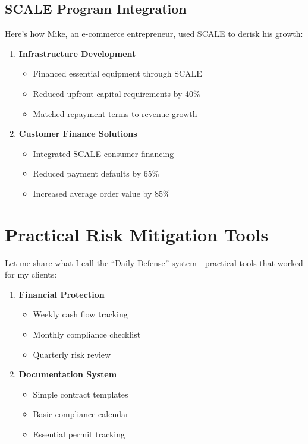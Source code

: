 \subsection{SCALE Program Integration}\label{subsec:scale-program-integration}

Here's how Mike, an e-commerce entrepreneur, used SCALE to derisk his growth:

\begin{enumerate}
    \item \textbf{Infrastructure Development}
    \begin{itemize}
        \item Financed essential equipment through SCALE
        \item Reduced upfront capital requirements by 40\%
        \item Matched repayment terms to revenue growth
    \end{itemize}

    \item \textbf{Customer Finance Solutions}
    \begin{itemize}
        \item Integrated SCALE consumer financing
        \item Reduced payment defaults by 65\%
        \item Increased average order value by 85\%
    \end{itemize}
\end{enumerate}

\section{Practical Risk Mitigation Tools}\label{sec:risk-tools}

Let me share what I call the ``Daily Defense'' system—practical tools that worked for my clients:

\begin{enumerate}
    \item \textbf{Financial Protection}
    \begin{itemize}
        \item Weekly cash flow tracking
        \item Monthly compliance checklist
        \item Quarterly risk review
    \end{itemize}

    \item \textbf{Documentation System}
    \begin{itemize}
        \item Simple contract templates
        \item Basic compliance calendar
        \item Essential permit tracking
    \end{itemize}
\end{enumerate}

